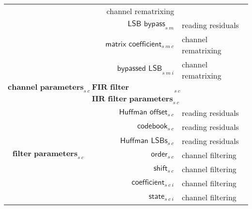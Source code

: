 \begin{landscape}
{\begin{tabular}{rrl}
& channel rematrixing \\
& $\textsf{LSB bypass}_{s~m}$
& reading residuals \\
& $\textsf{matrix coefficient}_{s~m~c}$
& channel rematrixing \\
& $\textsf{bypassed LSB}_{s~m~i}$
& channel rematrixing \\
\hline
\hyperref[mlp:readchannelparams]{$\textbf{channel parameters}_{s~c}$}
& \hyperref[mlp:readfirfilterparams]{$\textbf{FIR filter parameters}_{s~c}$} \\
& \hyperref[mlp:readiirfilterparams]{$\textbf{IIR filter parameters}_{s~c}$} \\
& $\textsf{Huffman offset}_{s~c}$
& reading residuals \\
& $\textsf{codebook}_{s~c}$
& reading residuals \\
& $\textsf{Huffman LSBs}_{s~c}$
& reading residuals \\
\hline
\hyperref[mlp:readfilterparams]{$\textbf{filter parameters}_{s~c}$}
& $\textsf{order}_{s~c}$
& channel filtering \\
& $\textsf{shift}_{s~c}$
& channel filtering \\
& $\textsf{coefficient}_{s~c~i}$
& channel filtering \\
& $\textsf{state}_{s~c~i}$
& channel filtering \\
\end{tabular}
}


\end{landscape}

